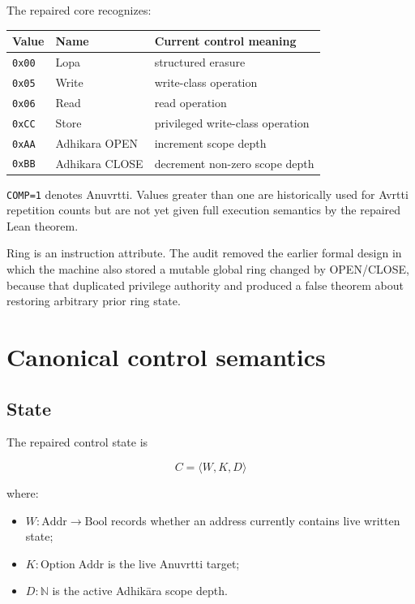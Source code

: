 \documentclass[11pt,a4paper]{article}
\begin{document}
The repaired core recognizes:

\begin{center}
\begin{tabular}{lll}
\toprule
Value & Name & Current control meaning \\
\midrule
\texttt{0x00} & Lopa & structured erasure \\
\texttt{0x05} & Write & write-class operation \\
\texttt{0x06} & Read & read operation \\
\texttt{0xCC} & Store & privileged write-class operation \\
\texttt{0xAA} & Adhikara OPEN & increment scope depth \\
\texttt{0xBB} & Adhikara CLOSE & decrement non-zero scope depth \\
\bottomrule
\end{tabular}
\end{center}

\texttt{COMP=1} denotes Anuvrtti. Values greater than one are historically
used for Avrtti repetition counts but are not yet given full execution
semantics by the repaired Lean theorem.

Ring is an instruction attribute. The audit removed the earlier formal design
in which the machine also stored a mutable global ring changed by OPEN/CLOSE,
because that duplicated privilege authority and produced a false theorem about
restoring arbitrary prior ring state.

\section{Canonical control semantics}

\subsection{State}

The repaired control state is

\[
C = \langle W, K, D \rangle
\]

where:

\begin{itemize}
\item $W : \mathrm{Addr} \rightarrow \mathrm{Bool}$ records whether an
      address currently contains live written state;
\item $K : \mathrm{Option}\;\mathrm{Addr}$ is the live Anuvrtti target;
\item $D : \mathbb{N}$ is the active Adhik\={a}ra scope depth.
\end{itemize}
\end{document}

